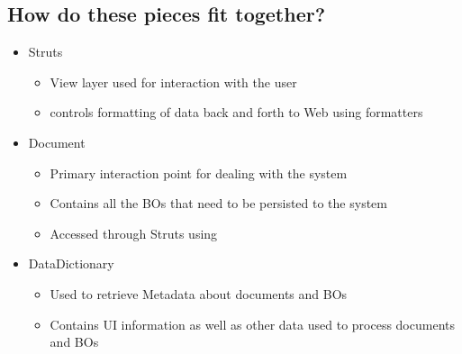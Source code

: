 \begin{ifhtml}
\begin{s5slide}
        \section{How do these pieces fit together?}
            \begin{itemize}
                \item Struts
                \begin{itemize}
                    \item View layer used for interaction with the user
                    \item controls formatting of data back and forth to Web using formatters 
                \end{itemize}
                \item Document
                \begin{itemize}
                    \item Primary interaction point for dealing with the system
                    \item Contains all the BOs that need to be persisted to the system
                    \item Accessed through Struts using 
                \end{itemize}
                \item DataDictionary
                \begin{itemize}
                    \item Used to retrieve Metadata about documents and BOs
                    \item Contains UI information as well as other data used to process documents and BOs
                \end{itemize}
            \end{itemize}
    \end{s5slide}
    \begin{s5slide}

\end{s5slide}
\end{ifhtml}
